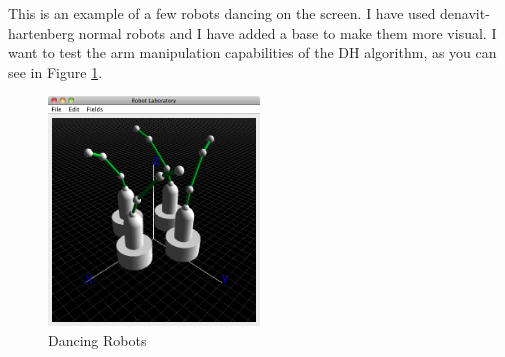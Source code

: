 \documentclass[12pt,a4paper,oneside,english]{book}
\begin{document}
This is an example of a few robots dancing on the screen. I have used denavit-hartenberg normal robots and I have added a base to make them more visual. I want to test the arm manipulation capabilities of the DH algorithm, as you can see in Figure \ref{dancing dobots}.

\begin{figure}[htbp]
\begin{center}
\includegraphics[width=0.5\textwidth]{images/DR.png}
\caption{Dancing Robots}
\label{dancing dobots}
\end{center}
\end{figure}
\end{document}
